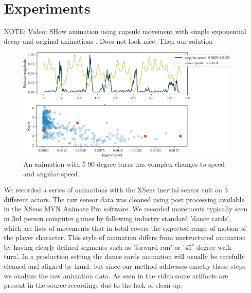 \section{Experiments}

NOTE: Video: SHow animation using capsule movement with simple exponential decay and original animations . Does not look nice. Then our solution


\begin{figure}
    \centering
    \includegraphics[width=1.0\columnwidth]{img/movement_stats.png}
    \caption{An animation with 5 90 degree turns has complex changes to speed and angular speed.}
    \label{fig:results:trajectory_estimation}
\end{figure}
We recorded a series of animations with the XSens inertial sensor suit on 3 different actors. The raw sensor data was cleaned using post processing available in the XSens MVN Animate Pro software. We recorded movements typically seen in 3rd person computer games by following industry standard 'dance cards', which are lists of movements that in total covers the expected range of motion of the player character. This style of animation differs from unstructured animation by having clearly defined segments such as 'forward-run' or '$45^o$-degree-walk-turn'. In a production setting the dance cards animation will usually be carefully cleaned and aligned by hand, but since our method addresses exactly those steps we analyze the raw animation data. As seen in the video some artifacts are present in the source recordings due to the lack of clean up.

